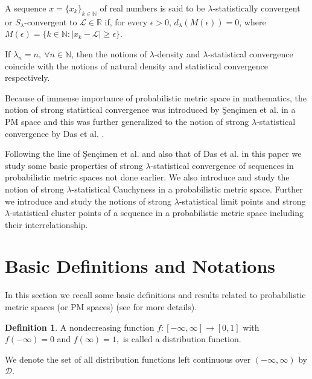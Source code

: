 \documentclass[reqno,b5paper]{amsart}
\theoremstyle{plain}
\theoremstyle{definition}
\newtheorem{defn}{Definition}[section]
\begin{document}
A sequence $x=\{x_k\}_{k \in \mathbb{N}}$ of real numbers is said
to be $\lambda$-statistically convergent or $S_\lambda$-convergent
to $\mathcal{L}\in\mathbb{R}$ if, for every $\epsilon>0$,
$d_\lambda(M(\epsilon))=0$, where
$M(\epsilon)=\{k\in\mathbb{N}:\left|x_k-\mathcal{L}\right|\geq\epsilon\}$.

If $\lambda_n=n, ~\forall n\in\mathbb{N}$, then the notions of
$\lambda$-density and $\lambda$-statistical convergence coincide
with the notions of natural density and statistical convergence
respectively.

Because of immense importance of probabilistic metric space in
mathematics, the notion of strong statistical convergence was
introduced by \c{S}en\c{c}imen et al. \cite{Se} in a PM space and
this was further generalized to the notion of strong
$\lambda$-statistical convergence by Das et al. \cite{Da3}.

Following the line of \c{S}en\c{c}imen et al. \cite{Se} and also
that of Das et al. \cite{Da3} in this paper we study some basic
properties of strong $\lambda$-statistical convergence of
sequences in probabilistic metric spaces not done earlier. We also
introduce and study the notion of strong $\lambda$-statistical
Cauchyness in a probabilistic metric space. Further we introduce
and study the notions of strong $\lambda$-statistical limit points
and strong $\lambda$-statistical cluster points of a sequence in a
probabilistic metric space including their interrelationship.


\section{\textbf{Basic Definitions and Notations}}

In this section we recall some basic definitions and results
related to probabilistic metric spaces (or PM spaces) (see
\cite{Sh, Sh1, Sh2, Sh3, Sh4} for more details).
\begin{defn}
A nondecreasing function $f: [-\infty, \infty] \rightarrow [0,1]$
with $f(-\infty)=0$ and $ f(\infty)=1,$ is called a distribution
function.
\end{defn}
We denote the set of all distribution functions left continuous
over $(-\infty,\infty)$ by $\mathcal{D}$.
\end{document}
